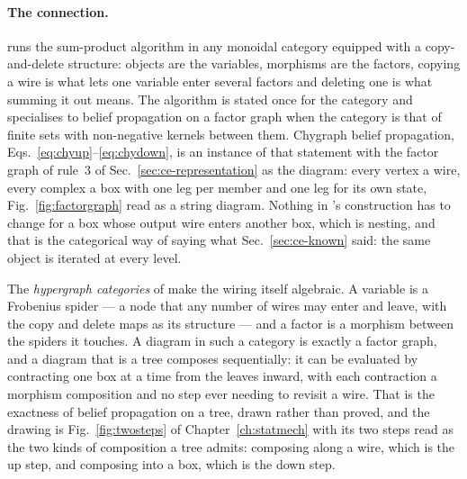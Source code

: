 \paragraph{The connection.} \citet{morton2014} runs the sum-product
algorithm in any monoidal category equipped with a copy-and-delete
structure: objects are the variables, morphisms are the factors, copying a
wire is what lets one variable enter several factors and deleting one is what
summing it out means. The algorithm is stated once for the category and
specialises to belief propagation on a factor graph when the category is that
of finite sets with non-negative kernels between them. Chygraph belief
propagation, Eqs.~\eqref{eq:chyup}--\eqref{eq:chydown}, is an instance of that
statement with the factor graph of rule~3 of Sec.~\ref{sec:ce-representation}
as the diagram: every vertex a wire, every complex a box with one leg per
member and one leg for its own state, Fig.~\ref{fig:factorgraph} read as a
string diagram. Nothing in \citeauthor{morton2014}'s construction has to
change for a box whose output wire enters another box, which is nesting, and
that is the categorical way of saying what Sec.~\ref{sec:ce-known} said: the
same object is iterated at every level.

The \emph{hypergraph categories} of \citet{fong2019} make the wiring itself
algebraic. A variable is a Frobenius spider --- a node that any number of
wires may enter and leave, with the copy and delete maps as its structure
--- and a factor is a morphism between the spiders it touches. A diagram in
such a category is exactly a factor graph, and a diagram that is a tree
composes sequentially: it can be evaluated by contracting one box at a time
from the leaves inward, with each contraction a morphism composition and no
step ever needing to revisit a wire. That is the exactness of belief
propagation on a tree, drawn rather than proved, and the drawing is
Fig.~\ref{fig:twosteps} of Chapter~\ref{ch:statmech} with its two steps read
as the two kinds of composition a tree admits: composing along a wire, which
is the up step, and composing into a box, which is the down step.

